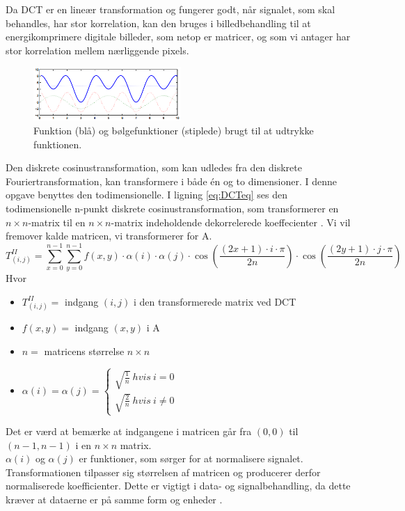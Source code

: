 Da DCT er en lineær transformation og fungerer godt, når signalet, som skal behandles, har stor korrelation, kan den bruges i billedbehandling til at energikomprimere digitale billeder, som netop er matricer, og som vi antager har stor korrelation mellem nærliggende pixels.

\begin{figure}[htbp]
\centering
\includegraphics[width=0.5\textwidth]{Billeder/sumafboelger.png}
\caption{Funktion (blå) og bølgefunktioner (stiplede) brugt til at udtrykke funktionen.}
\label{fig:sumafboelger}
\end{figure}

Den diskrete cosinustransformation, som kan udledes fra den diskrete Fouriertransformation, kan transformere i både én og to dimensioner. I denne opgave benyttes den todimensionelle. I ligning \vref{eq:DCTeq} ses den todimensionelle n-punkt diskrete cosinustransformation, som transformerer en $n \times n$-matrix til en $n \times n$-matrix indeholdende dekorrelerede koeffecienter \citep{guillermo_sapiro}. Vi vil fremover kalde matricen, vi transformerer for A. 
\begin{equation}
T^{II}_{(i,j)}=\sum\limits_{x=0}^{n-1} \sum\limits_{y=0}^{n-1} f(x,y) \cdot \alpha(i) \cdot \alpha(j) \cdot \cos\left(\frac{(2x+1)\cdot i \cdot \pi}{2n}\right) \cdot \cos\left(\frac{(2y+1)\cdot j \cdot \pi}{2n}\right)
\label{eq:DCTeq}
\end{equation}
Hvor
\begin{itemize}
	\item{$T^{II}_{(i,j)}=$ indgang $(i,j)$ i den transformerede matrix ved DCT}
	\item{$f(x,y)=$ indgang $(x,y)$ i A}
	\item{$n=$ matricens størrelse $n\times n$}
	\item{$\alpha(i)=\alpha(j)=\begin{cases}
						\sqrt{\frac{1}{n}} \ hvis \ i = 0\\
						\sqrt{\frac{2}{n}} \ hvis \ i \neq 0
					\end{cases}$}
\end{itemize}
Det er værd at bemærke at indgangene i matricen går fra $(0,0)$ til $(n-1,n-1)$ i en $n \times n$ matrix.\\
$\alpha(i)$  og $\alpha(j)$ er funktioner, som sørger for at normalisere signalet. Transformationen tilpasser sig størrelsen af matricen og producerer derfor normaliserede koefficienter. Dette er vigtigt i data- og signalbehandling, da dette kræver at dataerne er på samme form og enheder \citep{normalization}.

